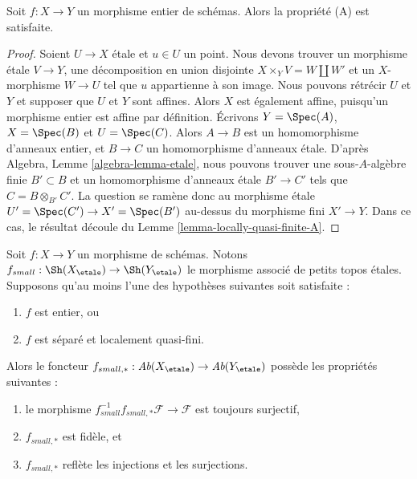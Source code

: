 \begin{lemma}
\label{lemma-integral-A}
Soit $f : X \to Y$ un morphisme entier de sch\'emas.
Alors la propri\'et\'e (A) est satisfaite.
\end{lemma}

\begin{proof}
Soient $U \to X$ \'etale et $u \in U$ un point.
Nous devons trouver un morphisme \'etale $V \to Y$, une d\'ecomposition en union disjointe
$X \times_Y V = W \amalg W'$ et un $X$-morphisme $W \to U$
tel que $u$ appartienne \`a son image. Nous pouvons r\'etr\'ecir $U$ et $Y$ et supposer
que $U$ et $Y$ sont affines. Alors $X$ est \'egalement affine, puisqu'un
morphisme entier est affine par d\'efinition. \'Ecrivons $Y = \Spec(A)$,
$X = \Spec(B)$ et $U = \Spec(C)$. Alors $A \to B$ est un
homomorphisme d'anneaux entier, et $B \to C$ un homomorphisme d'anneaux \'etale. D'apr\`es
Algebra, Lemme \ref{algebra-lemma-etale},
nous pouvons trouver une sous-$A$-alg\`ebre finie $B' \subset B$ et un homomorphisme d'anneaux \'etale
$B' \to C'$ tels que $C = B \otimes_{B'} C'$. La question
se ram\`ene donc au morphisme \'etale
$U' = \Spec(C') \to X' = \Spec(B')$
au-dessus du morphisme fini $X' \to Y$. Dans ce cas, le r\'esultat d\'ecoule du
Lemme \ref{lemma-locally-quasi-finite-A}.
\end{proof}

\begin{lemma}
\label{lemma-when-push-pull-surjective}
Soit $f : X \to Y$ un morphisme de sch\'emas. Notons
$f_{small} :
\Sh(X_\etale)
\to
\Sh(Y_\etale)$
le morphisme associ\'e de petits topos \'etales. Supposons qu'au moins l'une
des hypoth\`eses suivantes soit satisfaite :
\begin{enumerate}
\item $f$ est entier, ou
\item $f$ est s\'epar\'e et localement quasi-fini.
\end{enumerate}
Alors le foncteur
$f_{small, *} :
\textit{Ab}(X_\etale)
\to
\textit{Ab}(Y_\etale)$
poss\`ede les propri\'et\'es suivantes :
\begin{enumerate}
\item le morphisme
$f_{small}^{-1}f_{small, *}\mathcal{F} \to \mathcal{F}$
est toujours surjectif,
\item $f_{small, *}$ est fid\`ele, et
\item $f_{small, *}$ refl\`ete les injections et les surjections.
\end{enumerate}
\end{lemma}


